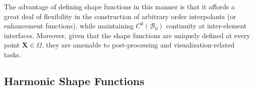 	
	The advantage of defining shape functions in this manner is that it affords a great deal of flexibility in the construction of arbitrary order interpolants (or enhancement functions), while maintaining $C^0 (\mathcal{B}_0)$ continuity at inter-element interfaces. Moreover, given that the shape functions are uniquely defined at every point $\mathbf{X} \in \Omega$, they are amenable to post-processing and visualization-related tasks.
	

\subsection*{Harmonic Shape Functions}


